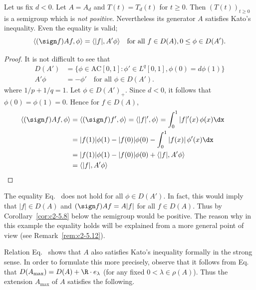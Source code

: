 Let us fix $d < 0$. Let $A = A_{d}$ and $T(t) = T_{d}(t)$ for $t \geq 0$. Then
$(T(t))_{t \geq 0}$ is a semigroup which is \emph{not positive}. Nevertheless its generator $A$ satisfies Kato's inequality. Even the equality is valid;
\ie
\begin{equation}\label{eq:c2-3.10}
\langle(\sign  f) Af,\phi\rangle = \langle|f|,A'\phi \rangle \quad \text{for all } f \in D(A), 0 \leq \phi \in D(A').
\end{equation}
\begin{proof}
It is not difficult to see that
\begin{equation}\label{eq:c2-3.11}
\begin{array}{rl}
D(A') &= \{\phi \in \text{AC}[0,1] \colon \phi' \in L^{q}[0,1], \phi(0) = d\phi(1)\}\\ 
A'\phi &= -\phi' \quad \text{for all } \phi \in D(A').
\end{array}
\end{equation}
where $1/p + 1/q = 1$. Let $\phi \in D(A')_{+}$. 
Since $d < 0$, it follows that $\phi(0) = \phi(1) = 0$. 
Hence for $f \in D(A)$,
\begin{align*}
\langle(\sign  f)Af,\phi\rangle &= \langle(\sign  f)f',\phi\rangle = \langle|f|',\phi\rangle 
= \int_{0}^{1} |f|'(x) \, \phi(x) \dx\\
&= |f(1)|\phi(1) - |f(0)|\phi(0) - \int_{0}^{1} |f(x)| \, \phi'(x) \dx\\
&= |f(1)|\phi(1) - |f(0)|\phi(0) + \langle|f|,A'\phi\rangle\\
&= \langle|f|,A'\phi\rangle
&&\qedhere
\end{align*}
\end{proof}
\begin{remark}\label{rem:c2-3.15}
The equality Eq.~ does not hold for all $\phi \in D(A')$. 
In fact, this would imply that $|f| \in D(A)$ and $(\sign  f)Af = A|f|$ for
all $f \in D(A)$. 
Thus by Corollary~\ref{cor:c2-5.8}
below the semigroup would be positive. 
The reason why in this example the equality holds will be explained from a more general point of view 
(see Remark~\ref{rem:c2-5.12}).
\end{remark}
Relation Eq.~ shows that $A$ also satisfies Kato's inequality
formally in the strong sense. 
In order to formulate this more precisely, observe that it follows from Eq.~ that $D(A_{\max}) = D(A) + \R \cdot e_{\lambda}$ (for any fixed $0 < \lambda \in \rho(A)$). Thus the extension $A_{\max}$ of\/ $A$ satisfies the following.
